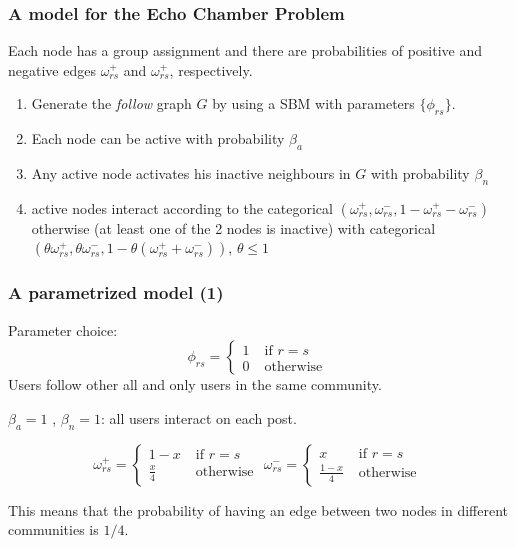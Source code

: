 \documentclass{beamer}
\begin{document}
\begin{frame}[c]
	\frametitle{A model for the Echo Chamber Problem}
	Each node has a group assignment and there are probabilities of
	positive and negative edges $\omega _{rs}^{+}  $ and $\omega _{rs}^{+}  $,
	respectively.

	\begin{enumerate}
		\item Generate the \emph{follow} graph $G$ by using a SBM with parameters
		      $\{ \phi _{rs}  \}$.
		\item Each node can be active with probability $\beta_{a}  $
		\item Any active node activates his inactive neighbours in $G$ with
		      probability $\beta_n$
		\item active nodes interact according to the categorical $(\omega _{rs}
			      ^{+}, \omega _{rs} ^{-}, 1 - \omega _{rs} ^{+} - \omega _{rs} ^{-})
		      $ otherwise (at least one of the 2 nodes is inactive) with
		      categorical $(\theta \omega _{rs} ^{+}, \theta \omega _{rs} ^{-}, 1
			      - \theta (\omega _{rs} ^{+} + \omega _{rs} ^{-}))$, $\theta \leq 1$
	\end{enumerate}

\end{frame}

\begin{frame}[c]
	\frametitle{A parametrized model (1)}
	Parameter choice:
	\begin{equation}
		\phi_{rs}  =
		\begin{cases}
			1 \; & \text{if } r = s  \\
			0 \; & \text{otherwise }
		\end{cases}
	\end{equation}
	Users follow other all and only users in the same community.

	\bigskip

	$\beta _{a} = 1$ , $\beta_{n} = 1 $: all users interact on each post.

	\begin{equation}
		\omega_{rs}^{+}   =
		\begin{cases}
			1 - x \;        & \text{if } r = s  \\
			\frac{x}{4}  \; & \text{otherwise }
		\end{cases}
		\omega_{rs}^{-}   =
		\begin{cases}
			x \;                & \text{if } r = s  \\
			\frac{1 - x}{4}  \; & \text{otherwise }
		\end{cases}
	\end{equation}

	This means that the probability of having an edge between two nodes in
	different communities is $1/4$.
\end{frame}
\end{document}
